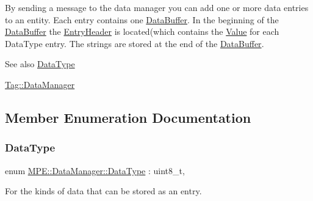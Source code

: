 By sending a message to the data manager you can add one or more data entries to an entity. Each entry contains one \hyperlink{struct_m_p_e_1_1_data_manager_1_1_data_buffer}{Data\+Buffer}. In the beginning of the \hyperlink{struct_m_p_e_1_1_data_manager_1_1_data_buffer}{Data\+Buffer} the \hyperlink{struct_m_p_e_1_1_data_manager_1_1_entry_header}{Entry\+Header} is located(which contains the \hyperlink{struct_m_p_e_1_1_data_manager_1_1_value}{Value} for each Data\+Type entry. The strings are stored at the end of the \hyperlink{struct_m_p_e_1_1_data_manager_1_1_data_buffer}{Data\+Buffer}. \begin{DoxySeeAlso}{See also}
\hyperlink{class_m_p_e_1_1_data_manager_aeebd98a9feed805f5ebd63276f003f5f}{Data\+Type} 

\hyperlink{namespace_m_p_e_1_1_tag_1_1_data_manager}{Tag\+::\+Data\+Manager} 
\end{DoxySeeAlso}


\subsection{Member Enumeration Documentation}
\mbox{\label{class_m_p_e_1_1_data_manager_aeebd98a9feed805f5ebd63276f003f5f}} 
\subsubsection{\texorpdfstring{Data\+Type}{DataType}}
{\footnotesize\ttfamily enum \hyperlink{class_m_p_e_1_1_data_manager_aeebd98a9feed805f5ebd63276f003f5f}{M\+P\+E\+::\+Data\+Manager\+::\+Data\+Type} \+: uint8\+\_\+t\hspace{0.3cm}{\ttfamily [strong]}, {\ttfamily [private]}}



For the kinds of data that can be stored as an entry. 

